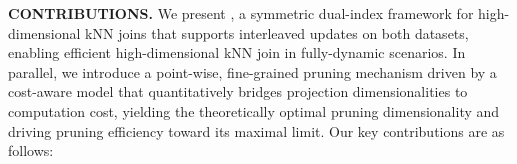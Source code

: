 \noindent \textbf{CONTRIBUTIONS.} We present \dualtree, a symmetric dual-index framework for high-dimensional kNN joins that supports interleaved updates on both datasets, enabling efficient high-dimen\-sional kNN join in fully-dynamic scenarios. In parallel, we introduce a point-wise, fine-grained pruning mechanism driven by a cost-aware model that quantitatively bridges projection dimensionalities to computation cost, yielding the theoretically optimal pruning dimensionality and driving pruning efficiency toward its maximal limit.
%
Our key contributions are as follows:

